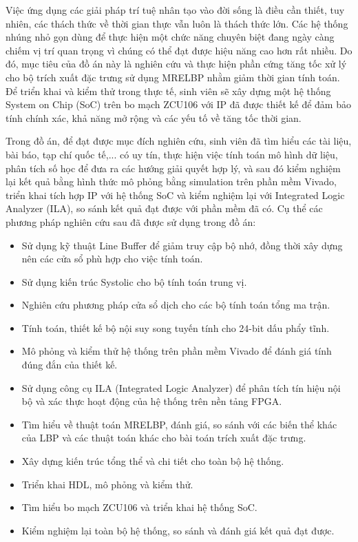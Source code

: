 Việc ứng dụng các giải pháp trí tuệ nhân tạo vào đời sống là điều cần thiết, tuy nhiên, các thách thức về thời gian thực vẫn luôn là thách thức lớn. Các hệ thống nhúng nhỏ gọn dùng để thực hiện một chức năng chuyên biệt đang ngày càng chiếm vị trí quan trọng vì chúng có thể đạt được hiệu năng cao hơn rất nhiều. Do đó, mục tiêu của đồ án này là nghiên cứu và thực hiện phần cứng tăng tốc xử lý cho bộ trích xuất đặc trưng sử dụng MRELBP nhằm giảm thời gian tính toán. Để triển khai và kiểm thử trong thực tế, sinh viên sẽ xây dựng một hệ thống System on Chip (SoC) trên bo mạch ZCU106 với IP đã được thiết kế để đảm bảo tính chính xác, khả năng mở rộng và các yếu tố về tăng tốc thời gian.
\vspace{0.3cm}


\vspace{0.3cm}

Trong đồ án, để đạt được mục đích nghiên cứu, sinh viên đã tìm
hiểu các tài liệu, bài báo, tạp chí quốc tế,... có uy tín, thực hiện việc tính toán mô hình dữ liệu, phân tích số học để đưa ra các hướng giải quyết hợp lý, và sau đó kiểm nghiệm lại kết quả bằng hình thức mô phỏng bằng simulation trên phần mềm Vivado, triển khai tích hợp IP với hệ thống SoC và kiểm nghiệm lại với Integrated Logic Analyzer (ILA), so sánh kết quả đạt được với phần mềm đã có.  Cụ thể các phương pháp nghiên cứu sau đã được sử dụng trong đồ án:
\renewcommand{\labelitemi}{$-$}
\begin{itemize}
	\item Sử dụng kỹ thuật Line Buffer để giảm truy cập bộ nhớ, đồng thời xây dựng nên các cửa sổ phù hợp cho việc tính toán.
	\item Sử dụng kiến trúc Systolic cho bộ tính toán trung vị.
	\item Nghiên cứu phương pháp cửa sổ dịch cho các bộ tính toán tổng ma trận.
	\item Tính toán, thiết kế bộ nội suy song tuyến tính cho 24-bit dấu phẩy tĩnh.
	\item Mô phỏng và kiểm thử hệ thống trên phần mềm Vivado để đánh giá tính đúng đắn của thiết kế.
	\item Sử dụng công cụ ILA (Integrated Logic Analyzer) để phân tích tín hiệu nội bộ và xác thực hoạt động của hệ thống trên nền tảng FPGA.
	 
\end{itemize} 
\renewcommand{\labelitemi}{$-$}
\begin{itemize}
	\item Tìm hiểu về thuật toán MRELBP, đánh giá, so sánh với các biến thể khác của LBP và các thuật toán khác cho bài toán trích xuất đặc trưng.
	\item Xây dựng kiến trúc tổng thể và chi tiết cho toàn bộ hệ thống.
	\item Triển khai HDL, mô phỏng và kiểm thử.
	\item Tìm hiểu bo mạch ZCU106 và triển khai hệ thống SoC.
	\item Kiểm nghiệm lại toàn bộ hệ thống, so sánh và đánh giá kết quả đạt được.
\end{itemize} 
\vspace{0.3cm}

